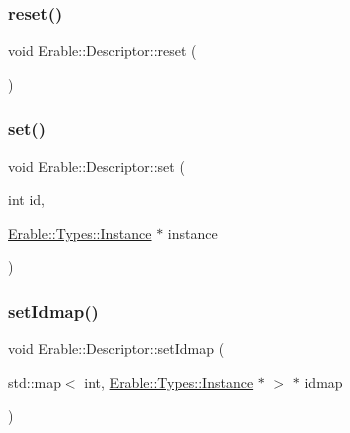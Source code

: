\subsubsection{\texorpdfstring{reset()}{reset()}}
{\footnotesize\ttfamily void Erable\+::\+Descriptor\+::reset (\begin{DoxyParamCaption}{ }\end{DoxyParamCaption})\hspace{0.3cm}{\ttfamily [inline]}}

\mbox{\label{class_erable_1_1_descriptor_ab276c219050350ff23bfaab7ba2a884c}} 
\subsubsection{\texorpdfstring{set()}{set()}}
{\footnotesize\ttfamily void Erable\+::\+Descriptor\+::set (\begin{DoxyParamCaption}\item[{int}]{id,  }\item[{\mbox{\hyperlink{class_erable_1_1_erable_1_1_types_1_1_instance}{Erable\+::\+Types\+::\+Instance}} $\ast$}]{instance }\end{DoxyParamCaption})}

\mbox{\label{class_erable_1_1_descriptor_ac9fc4917b73d37dd28c3ed465ee77f67}} 
\subsubsection{\texorpdfstring{setIdmap()}{setIdmap()}}
{\footnotesize\ttfamily void Erable\+::\+Descriptor\+::set\+Idmap (\begin{DoxyParamCaption}\item[{std\+::map$<$ int, \mbox{\hyperlink{class_erable_1_1_erable_1_1_types_1_1_instance}{Erable\+::\+Types\+::\+Instance}} $\ast$ $>$ $\ast$}]{idmap }\end{DoxyParamCaption})\hspace{0.3cm}{\ttfamily [inline]}}

\mbox{\label{class_erable_1_1_descriptor_abc43cc0e7df1c5f70797b50077971d51}} 
